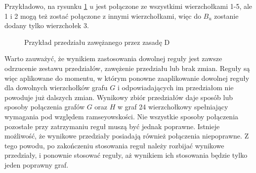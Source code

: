 Przykładowo, na rysunku \ref{zasadaD2} $u$ jest połączone ze wszystkimi wierzchołkami 1-5, ale 1 i 2 mogą też zostać połączone z innymi wierzchołkami, więc do
$B_u$ zostanie dodany tylko wierzchołek 3.   
\begin{figure}[H]
  \centering
 \caption{Przykład przedziału zawężanego przez zasadę D}
 \label{zasadaD2}
 \end{figure}

Warto zauważyć, że wynikiem zastosowania dowolnej reguły jest zawsze odrzucenie zestawu przedziałów, zawężenie przedziału lub brak zmian. Reguły są więc aplikowane do momentu, w którym ponowne zaaplikowanie dowolnej reguły dla dowolnych wierzchołków grafu $G$ i odpowiadających im przedziałom nie powoduje już dalszych zmian. Wynikowy zbiór przedziałów daje sposób lub sposoby połączenia grafów $G$ oraz $H$ w graf 24 wierzchołkowy spełniający wymagania pod względem ramseyowskości. Nie wszystkie sposoby połączenia pozostałe przy zatrzymaniu reguł muszą być jednak poprawne. Istnieje możliwość, że wynikowe przedziały posiadają również połączenia niepoprawne. Z tego powodu, po zakończeniu stosowania reguł należy rozbijać wynikowe przedziały, i ponownie stosować reguły, aż wynikiem ich stosowania będzie tylko jeden poprawny graf.

